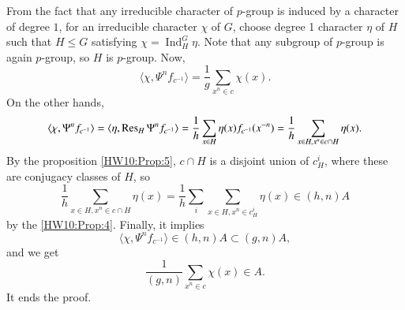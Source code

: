 \documentclass[a4paper, 12pt]{article}
\theoremstyle{Mydefinition}
\theoremstyle{Mytheorem}
\DeclareMathOperator{\Ind}{Ind}
\begin{document}
From the fact that any irreducible character of $p$-group is induced by a character of degree $1$, for an irreducible character $\chi$ of $G$, choose degree 1 character $\eta$ of $H$ such that $H\leq G$ satisfying $\chi = \Ind_H^G \eta$. Note that any subgroup of $p$-group is again $p$-group, so $H$ is $p$-group. Now,
\begin{equation}
    \langle \chi,\Psi^n f_{c^{-1}}\rangle = \frac{1}{g}\sum_{x^n\in c}\chi(x).
\end{equation}
On the other hands,
\begin{equation}
    \langle \chi,\Psi^n f_{c^{-1}}\rangle = \langle \eta,\Res_H\Psi^n f_{c^{-1}}\rangle =\frac{1}{h}\sum_{x\in H}\eta(x)f_{c^{-1}}(x^{-n}) = \frac{1}{h}\sum_{x\in H, x^n\in c\cap H}\eta(x).
\end{equation}
By the proposition \ref{HW10:Prop:5}, $c\cap H$ is a disjoint union of $c_H^i$, where these are conjugacy classes of $H$, so
\begin{equation}
    \frac{1}{h}\sum_{x\in H, x^n\in c\cap H}\eta(x) = \frac{1}{h}\sum_i\sum_{x\in H, x^n\in c^i_H}\eta(x)\in (h,n)A
\end{equation}
by the \ref{HW10:Prop:4}. Finally, it implies
\begin{equation}
    \langle \chi,\Psi^n f_{c^{-1}}\rangle\in (h,n)A\subset (g,n)A,
\end{equation}
and we get
\begin{equation}
    \frac{1}{(g,n)}\sum_{x^n\in c}\chi(x)\in A.
\end{equation}
It ends the proof.\\
\end{document}
